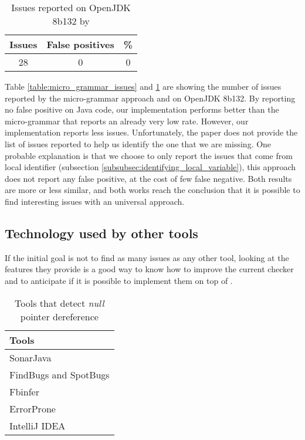 \begin{table}[h]
	\centering
	\caption{Issues reported on OpenJDK 8b132 by \slang{}}
	\label{table:slang_issues_jdk8}
	\begin{tabular}{|c|c|c|}
		\hline
		\bf Issues & \bf False positives & \bf \% \\ \hline
		28 &  0 &  0 \\ \hline
	\end{tabular}
\end{table}

Table \ref{table:micro_grammar_issues} and \ref{table:slang_issues_jdk8} are showing the number of issues reported by the micro-grammar approach and \slang{} on OpenJDK 8b132.
By reporting no false positive on Java code, our implementation performs better than the micro-grammar that reports an already very low rate.
However, our implementation reports less issues.
Unfortunately, the paper does not provide the list of issues reported to help us identify the one that we are missing.
One probable explanation is that we choose to only report the issues that come from local identifier (subsection \ref{subsubsec:identifying_local_variable}), this approach does not report any false positive, at the cost of few false negative.
Both results are more or less similar, and both works reach the conclusion that it is possible to find interesting issues with an universal approach.

\subsection{Technology used by other tools}
\label{subsec:other_tools_technology}

If the initial goal is not to find as many issues as any other tool, looking at the features they provide is a good way to know how to improve the current checker and to anticipate if it is possible to implement them on top of \slang{}.

\begin{table}[h]
	\centering
	\caption{Tools that detect \emph{null} pointer dereference}
	\label{table:tools_features}
	\begin{tabular}{|l|}
		\hline
		\bf Tools \\
		\hline
		SonarJava \cite{SonarJava:2019:Online} \\
		FindBugs \cite{Hovemeyer:2004:FBE:1052883.1052895} and SpotBugs \cite{spotBugs:2019:Online} \\
		Fbinfer \cite{fbInfer:2019:Online} \\
		ErrorProne \cite{errorProne:2019:Online} \\
		IntelliJ IDEA \cite{intelJIDEA:2019:Online} \\
		\hline    
	\end{tabular}
\end{table}

